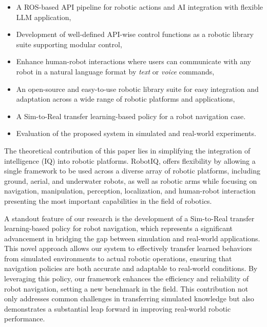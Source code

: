 \begin{itemize}
    \item  A ROS-based API pipeline for robotic actions and AI integration with flexible LLM application,

    \item Development of well-defined API-wise control functions as a robotic library suite supporting modular control,
    
   
    \item Enhance human-robot interactions where users can communicate with any robot in a natural language format by \textit{text} or \textit{voice} commands, 

    \item An open-source and easy-to-use robotic library suite for easy integration and adaptation across a wide range of robotic platforms and applications,
    
    \item A Sim-to-Real transfer learning-based policy for a robot navigation case.

    \item Evaluation of the proposed system in simulated and real-world experiments.

\end{itemize}



The theoretical contribution of this paper lies in simplifying the integration of intelligence (IQ) into robotic platforms. RobotIQ, offers flexibility by allowing a single framework to be used across a diverse array of robotic platforms, including ground, aerial, and underwater robots, as well as robotic arms while focusing on navigation, manipulation, perception, localization, and human-robot interaction presenting the most important capabilities in the field of robotics. 

A standout feature of our research is the development of a Sim-to-Real transfer learning-based policy for robot navigation, which represents a significant advancement in bridging the gap between simulation and real-world applications. This novel approach allows our system to effectively transfer learned behaviors from simulated environments to actual robotic operations, ensuring that navigation policies are both accurate and adaptable to real-world conditions. By leveraging this policy, our framework enhances the efficiency and reliability of robot navigation, setting a new benchmark in the field. This contribution not only addresses common challenges in transferring simulated knowledge but also demonstrates a substantial leap forward in improving real-world robotic performance.


